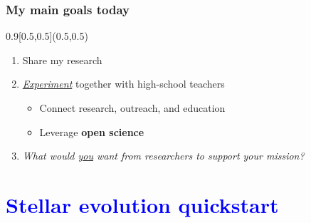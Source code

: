 \documentclass[xcolor=dvipsnames,professionalfonts, aspectratio=169]{beamer}
\begin{document}
\begin{frame}
  \frametitle{My main goals today}


  \begin{textblock}{0.9}[0.5,0.5](0.5,0.5)
    \centering
    \begin{enumerate}\Large
    \item Share my research\\[10pt]
    \item \emph{\underline{Experiment}} together with high-school teachers\\[10pt]
      \begin{itemize}\Large
      \item Connect research, outreach, and education
      \item Leverage \textbf{open science}
      \end{itemize}
    \item<2>[\textbf{Q.}] \emph{What would \underline{you} want from
        researchers to support your mission?}
    \end{enumerate}

  \end{textblock}

\end{frame}


\section{\textcolor{Blue}{Stellar evolution quickstart}}
\end{document}
